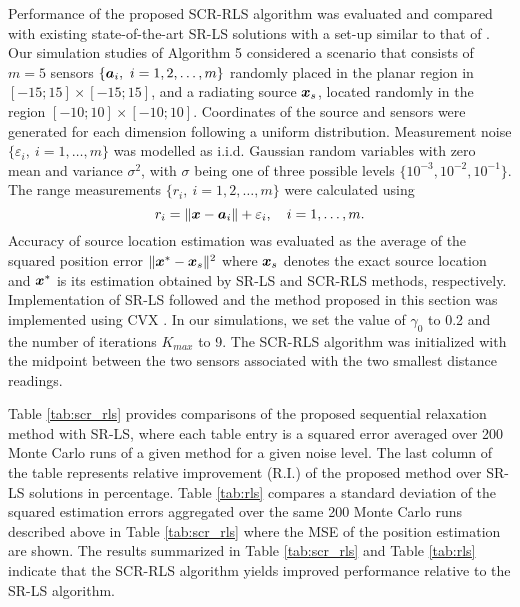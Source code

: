 Performance of the proposed SCR-RLS algorithm was evaluated and compared with existing state-of-the-art SR-LS solutions \cite{BeckStLi} with a set-up similar to that of \cite{BeckStLi}.   Our simulation studies of Algorithm 5 considered a scenario that consists of  $m = 5$ sensors $\{\mbox{\boldmath$a$}_i, \ i=1, 2,\ldots,m\}$ randomly placed in the planar region in $[-15;15]\times[-15;15]$, and a radiating source $\mbox{\boldmath$x$}_s$, located randomly in the region $[-10;10]\times[-10;10]$. Coordinates of the source and sensors were generated for each dimension following a uniform distribution. 
Measurement noise $\{\varepsilon_i, \ i=1,\ldots, m\}$ was modelled as i.i.d. Gaussian random variables with zero mean and variance $\sigma^2$, with $\sigma$ being one of three possible levels $\{10^{-3}, 10^{-2}, 10^{-1}\}$. The range measurements $\{r_i, \ i=1, 2,\ldots, m\}$ were calculated using 
\setcounter{abc}{0}
\begin{equation} \label{eq:5.0}
\nonumber
r_i = \|{\mbox{\boldmath$x$}} - {\mbox{\boldmath$a$}}_i\| + \varepsilon_i, \quad i = 1, \ldots , m.
\end{equation}
Accuracy of source location estimation was evaluated as the average of the squared position error $\|\mbox{\boldmath$x$}^* - \mbox{\boldmath$x$}_s\|^2$ where $\mbox{\boldmath$x$}_s$ denotes the exact source location and $\mbox{\boldmath$x$}^*$ is its estimation obtained by SR-LS and SCR-RLS methods, respectively. Implementation of SR-LS followed \cite{BeckStLi} and the method proposed in this section was implemented using CVX \cite{cvx}. In our simulations, we set the value of $\gamma_0$ to 0.2 and the number of iterations $K_{max}$ to 9. The SCR-RLS algorithm was initialized with the midpoint between the two sensors associated with the two smallest distance readings. 


Table \ref{tab:scr_rls} provides comparisons of the proposed sequential relaxation method with SR-LS, where each table entry is a squared error averaged over 200 Monte Carlo runs of a given method for a given noise level. The last column of the table  represents relative improvement (R.I.) of the proposed method over SR-LS solutions in percentage. %
Table \ref{tab:rls} compares a standard deviation of the squared  estimation errors  aggregated over the  same 200 Monte Carlo runs described above in Table \ref{tab:scr_rls} where the MSE of the position estimation are shown. The results
summarized in  Table \ref{tab:scr_rls} and Table \ref{tab:rls} indicate that the SCR-RLS algorithm yields improved performance relative to the SR-LS algorithm.

